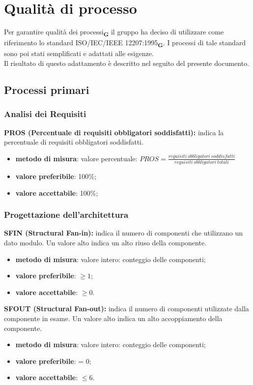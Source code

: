 \section{Qualità di processo}
Per garantire qualità dei processi\textsubscript{\textbf{G}} il gruppo ha deciso di utilizzare come riferimento lo standard ISO/IEC/IEEE 12207:1995\textsubscript{\textbf{G}}. 
I processi di tale standard sono poi stati semplificati e adattati alle esigenze.\\Il risultato di questo adattamento è descritto nel seguito del presente documento.
\subsection{Processi primari}
\subsubsection{Analisi dei Requisiti}
\textbf{PROS (Percentuale di requisiti obbligatori soddisfatti):} indica la percentuale di requisiti obbligatori soddisfatti.
\begin{itemize}
    \item \textbf{metodo di misura}: valore percentuale: $PROS = \frac{requisiti \ obbligatori \ soddisfatti}{requisiti \ obbligatori \ totali}$
    \item \textbf{valore preferibile}: 100\%;
    \item \textbf{valore accettabile}: 100\%;
\end{itemize}
\subsubsection{Progettazione dell'architettura}
\textbf{SFIN (Structural Fan-in):} indica il numero di componenti che utilizzano un dato modulo. Un valore alto indica un alto riuso della componente.
\begin{itemize}
    \item \textbf{metodo di misura}: valore intero: conteggio delle componenti;
    \item \textbf{valore preferibile}: $\geq 1$;
    \item \textbf{valore accettabile}: $\geq 0$.
\end{itemize}
\textbf{SFOUT (Structural Fan-out):} indica il numero di componenti utilizzate dalla componente in esame. Un valore alto indica un alto accoppiamento della componente.
\begin{itemize}
    \item \textbf{metodo di misura}: valore intero: conteggio delle componenti;
    \item \textbf{valore preferibile}: = 0;
    \item \textbf{valore accettabile}: $\leq 6$.
\end{itemize}
